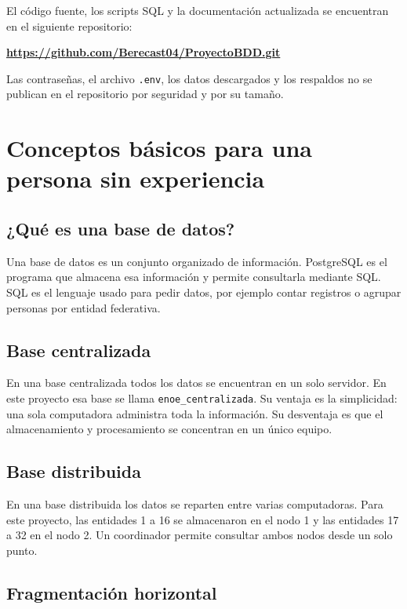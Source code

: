 \documentclass[12pt,letterpaper]{article}
\begin{document}
El código fuente, los scripts SQL y la documentación actualizada se encuentran
en el siguiente repositorio:

\begin{center}
\href{https://github.com/Berecast04/ProyectoBDD.git}
{\textbf{https://github.com/Berecast04/ProyectoBDD.git}}
\end{center}

Las contraseñas, el archivo \texttt{.env}, los datos descargados y los
respaldos no se publican en el repositorio por seguridad y por su tamaño.

\section{Conceptos básicos para una persona sin experiencia}

\subsection{¿Qué es una base de datos?}

Una base de datos es un conjunto organizado de información. PostgreSQL es el
programa que almacena esa información y permite consultarla mediante SQL. SQL
es el lenguaje usado para pedir datos, por ejemplo contar registros o agrupar
personas por entidad federativa.

\subsection{Base centralizada}

En una base centralizada todos los datos se encuentran en un solo servidor. En
este proyecto esa base se llama \texttt{enoe\_centralizada}. Su ventaja es la
simplicidad: una sola computadora administra toda la información. Su
desventaja es que el almacenamiento y procesamiento se concentran en un único
equipo.

\subsection{Base distribuida}

En una base distribuida los datos se reparten entre varias computadoras. Para
este proyecto, las entidades 1 a 16 se almacenaron en el nodo 1 y las entidades
17 a 32 en el nodo 2. Un coordinador permite consultar ambos nodos desde un
solo punto.

\subsection{Fragmentación horizontal}
\end{document}
